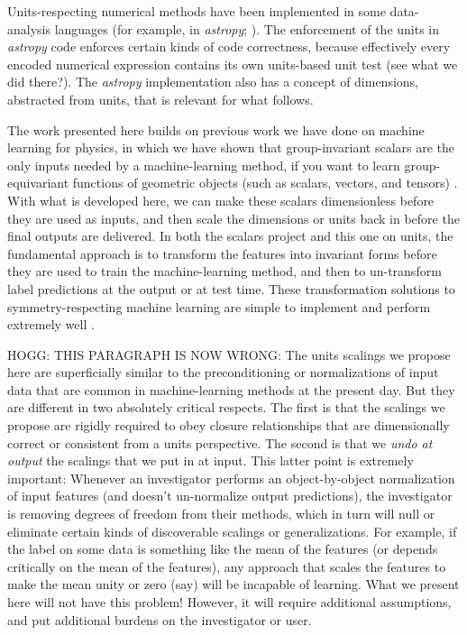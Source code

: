 \documentclass[12pt, letterpaper]{article}
\newcommand{\project}[1]{\textsl{#1}}
\newcommand{\astropy}{\project{astropy}}
\begin{document}
Units-respecting numerical methods have been implemented in some data-analysis languages (for example, in \astropy; \cite{astropy}).
The enforcement of the units in \astropy{} code enforces certain kinds of code correctness, because effectively every encoded numerical expression contains its own units-based unit test (see what we did there?).
The \astropy{} implementation also has a concept of dimensions, abstracted from units, that is relevant for what follows.

The work presented here builds on previous work we have done on machine learning for physics, in which we have shown that group-invariant scalars are the only inputs needed by a machine-learning method, if you want to learn group-equivariant functions of geometric objects (such as scalars, vectors, and tensors) \cite{villar, yao}.
With what is developed here, we can make these scalars dimensionless before they are used as inputs, and then scale the dimensions or units back in before the final outputs are delivered.
In both the scalars project and this one on units, the fundamental approach is to transform the features into invariant forms before they are used to train the machine-learning method, and then to un-transform label predictions at the output or at test time.
These transformation solutions to symmetry-respecting machine learning are simple to implement and perform extremely well \cite{yao}.

HOGG: THIS PARAGRAPH IS NOW WRONG: The units scalings we propose here are superficially similar to the preconditioning or normalizations of input data that are common in machine-learning methods at the present day.
But they are different in two absolutely critical respects.
The first is that the scalings we propose are rigidly required to obey closure relationships that are dimensionally correct or consistent from a units perspective.
The second is that we \emph{undo at output} the scalings that we put in at input.
This latter point is extremely important:
Whenever an investigator performs an object-by-object normalization of input features (and doesn't un-normalize output predictions), the investigator is removing degrees of freedom from their methods, which in turn will null or eliminate certain kinds of discoverable scalings or generalizations.
For example, if the label on some data is something like the mean of the features (or depends critically on the mean of the features), any approach that scales the features to make the mean unity or zero (say) will be incapable of learning.
What we present here will not have this problem!
However, it will require additional assumptions, and put additional burdens on the investigator or user.
\end{document}
